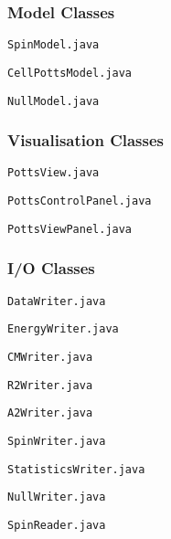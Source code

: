 \documentclass[a4paper,12pt]{article}
\newcommand*{\MyPath}{/Users/MichaelChiang/Dropbox/Edinburgh/Courses/Year 3/SH_Project/cell_potts_model}%
\begin{document}
\subsubsection{Model Classes}

\noindent\texttt{SpinModel.java}

\vspace*{0.5cm}
\noindent\texttt{CellPottsModel.java}

\vspace*{0.5cm}
\noindent\texttt{NullModel.java}


\subsubsection{Visualisation Classes}

\noindent\texttt{PottsView.java}

\vspace*{0.5cm}
\noindent\texttt{PottsControlPanel.java}

\vspace*{0.5cm}
\noindent\texttt{PottsViewPanel.java}



\subsubsection{I/O Classes}
\noindent\texttt{DataWriter.java}

\vspace*{0.5cm}
\noindent\texttt{EnergyWriter.java}

\vspace*{0.5cm}
\noindent\texttt{CMWriter.java}

\vspace*{0.5cm}
\noindent\texttt{R2Writer.java}

\vspace*{0.5cm}
\noindent\texttt{A2Writer.java}

\vspace*{0.5cm}
\noindent\texttt{SpinWriter.java}

\vspace*{0.5cm}
\noindent\texttt{StatisticsWriter.java}

\vspace*{0.5cm}
\noindent\texttt{NullWriter.java}

\vspace*{0.5cm}
\noindent\texttt{SpinReader.java}

\end{document}
